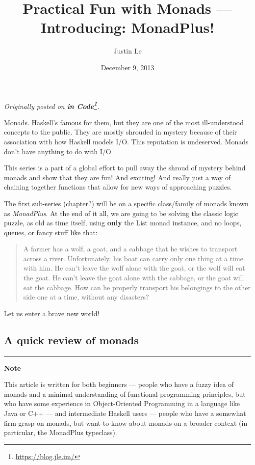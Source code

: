 \documentclass[]{article}
\title{Practical Fun with Monads --- Introducing: MonadPlus!}
\author{Justin Le}
\date{December 9, 2013}
\renewcommand{\href}[2]{#2\footnote{\url{#1}}}
\begin{document}
\maketitle

\emph{Originally posted on \textbf{\href{https://blog.jle.im/}{in
Code}}.}

Monads. Haskell's famous for them, but they are one of the most
ill-understood concepts to the public. They are mostly shrouded in
mystery because of their association with how Haskell models I/O. This
reputation is undeserved. Monads don't have anything to do with I/O.

This series is a part of a global effort to pull away the shroud of
mystery behind monads and show that they are fun! And exciting! And
really just a way of chaining together functions that allow for new ways
of approaching puzzles.

The first sub-series (chapter?) will be on a specific class/family of
monads known as \emph{MonadPlus}. At the end of it all, we are going to
be solving the classic logic puzzle, as old as time itself, using
\textbf{only} the List monad instance, and no loops, queues, or fancy
stuff like that:

\begin{quote}
A farmer has a wolf, a goat, and a cabbage that he wishes to transport
across a river. Unfortunately, his boat can carry only one thing at a
time with him. He can't leave the wolf alone with the goat, or the wolf
will eat the goat. He can't leave the goat alone with the cabbage, or
the goat will eat the cabbage. How can he properly transport his
belongings to the other side one at a time, without any disasters?
\end{quote}

Let us enter a brave new world!

\subsection{A quick review of monads}\label{a-quick-review-of-monads}

\begin{center}\rule{0.5\linewidth}{\linethickness}\end{center}

\textbf{Note}

This article is written for both beginners --- people who have a fuzzy
idea of monads and a minimal understanding of functional programming
principles, but who have some experience in Object-Oriented Programming
in a language like Java or C++ --- and intermediate Haskell users ---
people who have a somewhat firm grasp on monads, but want to know about
monads on a broader context (in particular, the MonadPlus typeclass).
\end{document}
